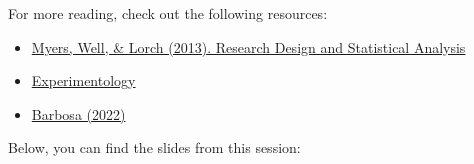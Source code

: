 \documentclass[
  letterpaper,
  DIV=11,
  numbers=noendperiod]{scrreprt}
\providecommand{\tightlist}{%
  \setlength{\itemsep}{0pt}\setlength{\parskip}{0pt}}\usepackage{longtable,booktabs,array}
\begin{document}
\begin{tcolorbox}[enhanced jigsaw, titlerule=0mm, left=2mm, colbacktitle=quarto-callout-tip-color!10!white, toptitle=1mm, colframe=quarto-callout-tip-color-frame, opacityback=0, leftrule=.75mm, title=\textcolor{quarto-callout-tip-color}{\faLightbulb}\hspace{0.5em}{Relevant readings}, coltitle=black, breakable, colback=white, bottomrule=.15mm, bottomtitle=1mm, arc=.35mm, toprule=.15mm, opacitybacktitle=0.6, rightrule=.15mm]

For more reading, check out the following resources:

\begin{itemize}
\tightlist
\item
  \href{https://granatensis.ugr.es/discovery/fulldisplay?docid=alma991014333689904990\&context=L\&vid=34CBUA_UGR:VU1}{Myers,
  Well, \& Lorch (2013). Research Design and Statistical Analysis}
\item
  \href{https://experimentology.io/}{Experimentology}
\item
  \href{https://jmourabarbosa.github.io/files/Barbosa_2022_BRM.pdf}{Barbosa
  (2022)}
\end{itemize}

\end{tcolorbox}

Below, you can find the slides from this session:
\end{document}
